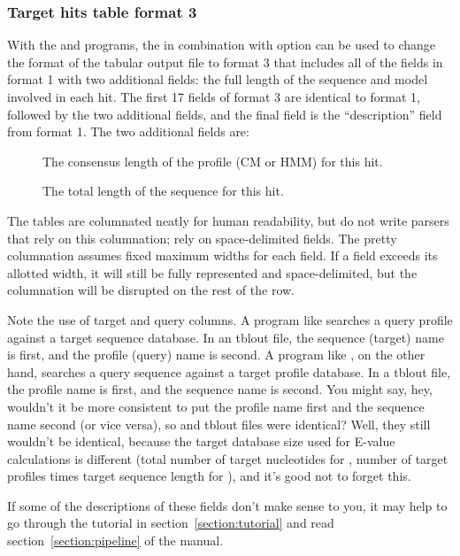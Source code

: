 \subsubsection{Target hits table format 3}
\label{tabular-format3}

With the  and  programs, the  
in combination with  option can be used to change
the format of the tabular output file to format 3 that includes all of
the fields in format 1 with two additional fields: the full length of
the sequence and model involved in each hit. The first 17 fields of
format 3 are identical to format 1, followed by the two additional
fields, and the final field is the ``description'' field from format
1. The two additional fields are:

\begin{description}

\item[]
The consensus length of the profile (CM or HMM) for this hit.

\item[]
The total length of the sequence for this hit.

\end{description}

The tables are columnated neatly for human readability, but do not
write parsers that rely on this columnation; rely on space-delimited
fields. The pretty columnation assumes fixed maximum widths for each
field. If a field exceeds its allotted width, it will still be fully
represented and space-delimited, but the columnation will be disrupted
on the rest of the row.

Note the use of target and query columns. A program like
 searches a query profile against a target sequence
database. In an  tblout file, the sequence (target)
name is first, and the profile (query) name is second. A program like
, on the other hand, searches a query sequence against a
target profile database. In a  tblout file, the profile
name is first, and the sequence name is second. You might say, hey,
wouldn't it be more consistent to put the profile name first and the
sequence name second (or vice versa), so  and
 tblout files were identical? Well, they
still wouldn't be identical, because the target database size used for
E-value calculations is different (total number of target nucleotides
for , number of target profiles times target sequence
length for ), and it's good not to forget this.

If some of the descriptions of these fields don't make sense to you,
it may help to go through the tutorial in
section~\ref{section:tutorial} and read section~\ref{section:pipeline}
of the manual. 

